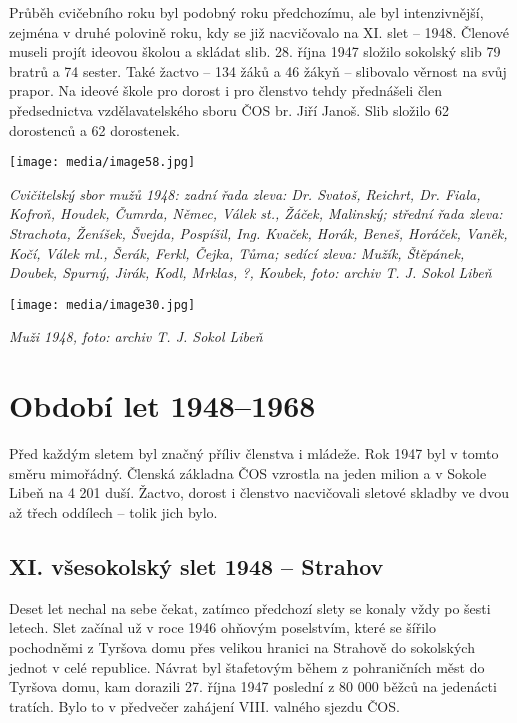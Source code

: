 Průběh cvičebního roku byl podobný roku předchozímu, ale byl
intenzivnější, zejména v druhé polovině roku, kdy se již nacvičovalo na
XI. slet -- 1948. Členové museli projít ideovou školou a skládat slib.
28. října 1947 složilo sokolský slib 79 bratrů a 74 sester. Také žactvo
-- 134 žáků a 46 žákyň -- slibovalo věrnost na svůj prapor. Na ideové
škole pro dorost i pro členstvo tehdy přednášeli člen předsednictva
vzdělavatelského sboru ČOS br. Jiří Janoš. Slib složilo 62 dorostenců a
62 dorostenek.

\texttt{[image: media/image58.jpg]}

\emph{Cvičitelský sbor mužů 1948: zadní řada zleva: Dr. Svatoš, Reichrt,
Dr. Fiala, Kofroň, Houdek, Čumrda, Němec, Válek st., Žáček, Malinský;
střední řada zleva: Strachota, Ženíšek, Švejda, Pospíšil, Ing. Kvaček,
Horák, Beneš, Horáček, Vaněk, Kočí, Válek ml., Šerák, Ferkl, Čejka,
Tůma; sedící zleva: Mužík, Štěpánek, Doubek, Spurný, Jirák, Kodl,
Mrklas, ?, Koubek,} \emph{foto: archiv T. J. Sokol Libeň}

\texttt{[image: media/image30.jpg]}

\emph{Muži 1948, foto: archiv T. J. Sokol Libeň}

\section{Období let 1948--1968}\label{obdobuxed-let-19481968}

Před každým sletem byl značný příliv členstva i mládeže. Rok 1947 byl v
tomto směru mimořádný. Členská základna ČOS vzrostla na jeden milion a v
Sokole Libeň na 4 201 duší. Žactvo, dorost i členstvo nacvičovali
sletové skladby ve dvou až třech oddílech -- tolik jich bylo.

\subsection{XI. všesokolský slet 1948 --
Strahov}\label{xi.-vux161esokolskuxfd-slet-1948-strahov}

Deset let nechal na sebe čekat, zatímco předchozí slety se konaly vždy
po šesti letech. Slet začínal už v roce 1946 ohňovým poselstvím, které
se šířilo pochodněmi z Tyršova domu přes velikou hranici na Strahově do
sokolských jednot v celé republice. Návrat byl štafetovým během z
pohraničních měst do Tyršova domu, kam dorazili 27. října 1947 poslední
z 80 000 běžců na jedenácti tratích. Bylo to v předvečer zahájení VIII.
valného sjezdu ČOS.

